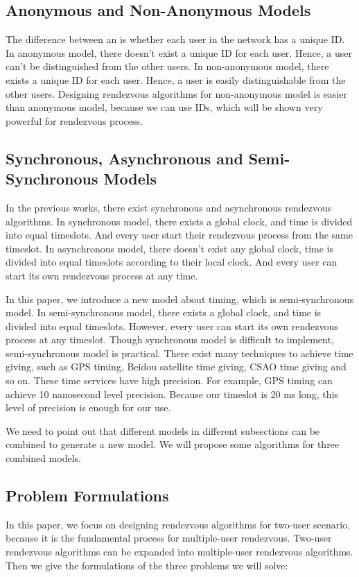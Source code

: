 \documentclass[10pt, conference, letterpaper]{IEEEtran}
\begin{document}
\subsection{Anonymous and Non-Anonymous Models}
The difference between an is whether each user in the network has a unique ID. In anonymous model, there doesn't exist a unique ID for each user. Hence, a user can't be distinguished from the other users. In non-anonymous model, there exists a unique ID for each user. Hence, a user is easily distinguishable from the other users. Designing rendezvous algorithms for non-anonymous model is easier than anonymous model, because we can use IDs, which will be shown very powerful for rendezvous process.

\subsection{Synchronous, Asynchronous and Semi-Synchronous Models}
In the previous works, there exist synchronous and asynchronous rendezvous algorithms. In synchronous model, there exists a global clock, and time is divided into equal timeslots. And every user start their rendezvous process from the same timeslot. In asynchronous model, there doesn't exist any global clock, time is divided into equal timeslots according to their local clock. And every user can start its own rendezvous process at any time.

In this paper, we introduce a new model about timing, which is semi-synchronous model. In semi-synchronous model, there exists a global clock, and time is divided into equal timeslots. However, every user can start its own rendezvous process at any timeslot. Though synchronous model is difficult to implement, semi-synchronous model is practical. There exist many techniques to achieve time giving, such as GPS timing, Beidou satellite time giving, CSAO time giving and so on. These time services have high precision. For example, GPS timing can achieve 10 nanosecond level precision. Because our timeslot is 20 ms long, this level of precision is enough for our use.

We need to point out that different models in different subsections can be combined to generate a new model. We will propose some algorithms for three combined models.

\subsection{Problem Formulations}
In this paper, we focus on designing rendezvous algorithms for two-user scenario, because it is the fundamental process for multiple-user rendezvous. Two-user rendezvous algorithms can be expanded into multiple-user rendezvous algorithms. Then we give the formulations of the three problems we will solve:
\end{document}
